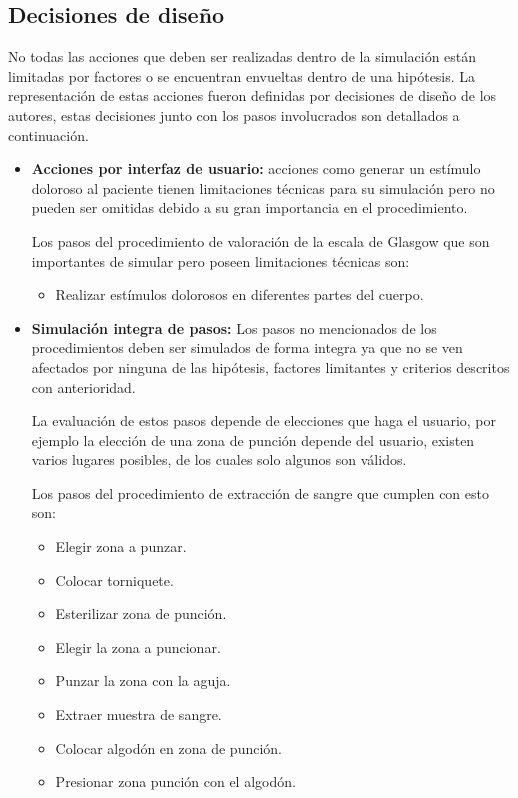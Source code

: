 \subsection{Decisiones de diseño}

No todas las acciones que deben ser realizadas dentro de la simulación están
limitadas por factores o se encuentran envueltas dentro de una hipótesis. La
representación de estas acciones fueron definidas por decisiones de diseño de
los autores, estas decisiones junto con los pasos involucrados son detallados a
continuación.

\begin{itemize}

\item \textbf{Acciones por interfaz de usuario:} acciones como generar un
    estímulo doloroso al paciente tienen limitaciones técnicas para su
    simulación pero no pueden ser omitidas debido a su gran importancia en el
    procedimiento.
 
    Los pasos del procedimiento de valoración de la escala de Glasgow que son
    importantes de simular pero poseen limitaciones técnicas son:
    \begin{itemize} 
    \item Realizar estímulos dolorosos en diferentes partes del cuerpo. 
    \end{itemize}
    
\item \textbf{Simulación integra de pasos:} Los pasos no mencionados de los
    procedimientos  deben ser simulados de forma integra ya que no se ven
    afectados por ninguna de las hipótesis, factores limitantes y criterios
    descritos con anterioridad.

La evaluación de estos pasos depende de elecciones que haga el usuario, por
ejemplo la elección de una zona de punción depende del usuario, existen varios
lugares posibles, de los cuales solo algunos son válidos. 

Los pasos del procedimiento de extracción de sangre que cumplen con esto son:
\begin{itemize}
    \item Elegir zona a punzar.
    \item Colocar torniquete.
    \item Esterilizar zona de punción.
    \item Elegir la zona a puncionar.
    \item Punzar la zona con la aguja.
    \item Extraer muestra de sangre.
    \item Colocar algodón en zona de punción.
    \item Presionar zona punción con el algodón.
\end{itemize}


\end{itemize}
